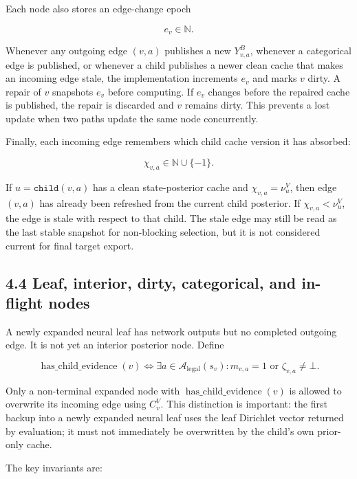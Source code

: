 \documentclass[11pt]{article}
\newcommand{\Legal}{\mathcal{A}_{\mathrm{legal}}}
\begin{document}
Each node also stores an edge-change epoch

\[
e_v\in\mathbb{N}.
\]

Whenever any outgoing edge \((v,a)\) publishes a new \(Y^B_{v,a}\), whenever a
categorical edge is published, or whenever a child publishes a newer clean cache
that makes an incoming edge stale, the implementation increments \(e_v\) and
marks \(v\) dirty. A repair of \(v\) snapshots \(e_v\) before computing. If
\(e_v\) changes before the repaired cache is published, the repair is discarded
and \(v\) remains dirty. This prevents a lost update when two paths update the
same node concurrently.

Finally, each incoming edge remembers which child cache version it has absorbed:

\[
\chi_{v,a}\in\mathbb{N}\cup\{-1\}.
\]

If \(u=\texttt{child}(v,a)\) has a clean state-posterior cache and
\(\chi_{v,a}=\nu^V_u\), then edge \((v,a)\) has already been refreshed from the
current child posterior. If \(\chi_{v,a}<\nu^V_u\), the edge is stale with
respect to that child. The stale edge may still be read as the last stable
snapshot for non-blocking selection, but it is not considered current for final
target export.

\subsection*{4.4 Leaf, interior, dirty, categorical, and in-flight nodes}

A newly expanded neural leaf has network outputs but no completed outgoing edge.
It is not yet an interior posterior node. Define

\[
\operatorname{has\_child\_evidence}(v)
\iff
\exists a\in\Legal(s_v):m_{v,a}=1\text{ or }\zeta_{v,a}\ne\bot.
\]

Only a non-terminal expanded node with
\(\operatorname{has\_child\_evidence}(v)\) is allowed to overwrite its incoming
edge using \(C^V_v\). This distinction is important: the first backup into a
newly expanded neural leaf uses the leaf Dirichlet vector returned by
evaluation; it must not immediately be overwritten by the child's own prior-only
cache.

The key invariants are:
\end{document}
